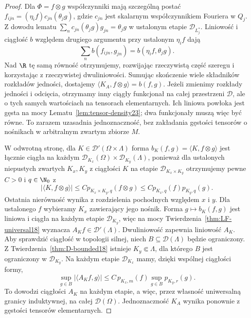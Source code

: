 \begin{proof}
Dla $\Phi=f\otimes g$ współczynniki mają szczególną
postać $f_{ijn}=(\eta_i f)c_{jn}(\theta_j g)$,
gdzie $c_{jn}$ jest skalarnym współczynnikiem Fouriera
w $Q_j$. Z dowodu lematu
$\sum_n c_{jn}(\theta_j g)g_{jn}=\theta_j g$
w ustalonym etapie $\mathcal D_{L_j^*}$.
Liniowość i ciągłość $b$ względem drugiego argumentu
przy ustalonym $\eta_i f$ dają
\[
 \sum_n b(f_{ijn},g_{jn})=b(\eta_i f,\theta_j g).
\]
Nad $\R$ tę samą równość otrzymujemy, rozwijając
rzeczywistą część szeregu i korzystając z rzeczywistej
dwuliniowości. Sumując skończenie wiele składników
rozkładów jedności, dostajemy
$\langle K_A,f\otimes g\rangle=b(f,g)$.
Jeżeli zmienimy rozkłady jedności i odcięcia, otrzymamy
inny ciągły funkcjonał na całej przestrzeni $\mathcal D$,
ale o tych samych wartościach na tensorach elementarnych.
Ich liniowa powłoka jest gęsta na mocy
Lematu~\ref{lem:tensor-density23}; dwa funkcjonały muszą
więc być równe. To zarazem uzasadnia jednoznaczność,
bez zakładania gęstości tensorów o nośnikach w arbitralnym
zwartym zbiorze $M$.

W odwrotną stronę, dla $K\in\mathcal D'(\Omega\times\Lambda)$
forma $b_K(f,g)=\langle K,f\otimes g\rangle$ jest
łącznie ciągła na każdym
$\mathcal D_{K_x}(\Omega)\times\mathcal D_{K_y}(\Lambda)$,
ponieważ dla ustalonych niepustych zwartych $K_x,K_y$
z ciągłości $K$ na etapie $\mathcal D_{K_x\times K_y}$
otrzymujemy pewne $C>0$ i $q\in\N_0$ z
\[
 |\langle K,f\otimes g\rangle|
 \le C p_{K_x\times K_y,q}(f\otimes g)
 \le C p_{K_x,q}(f)p_{K_y,q}(g).
\]
Ostatnia nierówność wynika z rozdzielenia pochodnych
względem $x$ i $y$. Dla ustalonego $f$ wybieramy
$K_x$ zawierający jego nośnik. Forma $g\mapsto b_K(f,g)$
jest liniowa i ciągła na każdym etapie $\mathcal D_{K_y}$,
więc na mocy Twierdzenia~\ref{thm:LF-universal18}
wyznacza $A_Kf\in\mathcal D'(\Lambda)$. Dwuliniowość
zapewnia liniowość $A_K$.
Aby sprawdzić ciągłość w topologii silnej, niech
$B\subseteq\mathcal D(\Lambda)$ będzie ograniczony.
Z Twierdzenia~\ref{thm:D-bounded18} istnieje
$K_y\Subset\Lambda$, dla którego $B$ jest ograniczony
w $\mathcal D_{K_y}$. Na każdym etapie $\mathcal D_{K_x}$
mamy, dzięki wspólnej ciągłości formy,
\[
 \sup_{g\in B}|\langle A_Kf,g\rangle|
 \le C\,p_{K_x,m}(f)\sup_{g\in B}p_{K_y,r}(g).
\]
To dowodzi ciągłości $A_K$ na każdym etapie, a więc,
przez własność uniwersalną granicy induktywnej,
na całej $\mathcal D(\Omega)$. Jednoznaczność $K_A$
wynika ponownie z gęstości tensorów elementarnych.
\end{proof}

